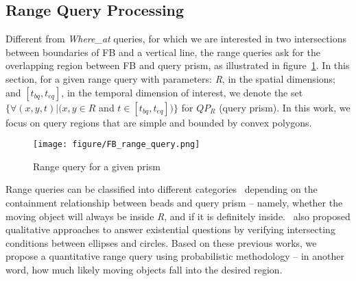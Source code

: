 \begin{comment}




\end{comment}

\subsection{Range Query Processing}
Different from {\it Where\_at} queries, for which we are interested in two intersections between boundaries of FB and a vertical line, the range queries ask for the overlapping region between FB and query prism, 
as illustrated in figure~\ref{FB-range}. In this section, for a given range query with parameters: \textit{R}, in the spatial
dimensions; and $[t_{bq}, t_{eq}]$, in the temporal dimension of interest, we denote the set $\{\forall(x, y, t)|(x, y\in R$ and $t \in [t_{bq}, t_{eq}])\}$ for $QP_R$ (query prism). In this work, we focus on query regions that are simple and bounded by convex polygons.

\begin{figure}
    \centering
    \texttt{[image: figure/FB\_range\_query.png]}
    \caption{Range query for a given prism}
    \label{FB-range}
\end{figure}

Range queries can be classified into different categories~\cite{TrajcevskiMDM10} depending on the containment relationship between beads and query prism
 -- namely, whether the moving object will always be inside \textit{R}, and if it is definitely inside.~\cite{TrajcevskiMDM10} also proposed qualitative approaches to answer existential questions by verifying
intersecting conditions between ellipses and circles. Based on these previous works, we propose a quantitative
range query using probabilistic methodology -- in another word, how much likely moving objects fall into the desired region. 

